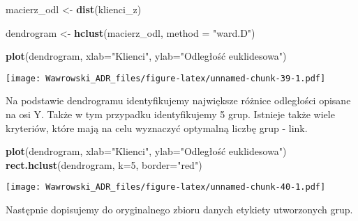 \documentclass[]{book}
\newenvironment{Shaded}{\begin{snugshade}}{\end{snugshade}}
\newcommand{\KeywordTok}[1]{\textcolor[rgb]{0.13,0.29,0.53}{\textbf{#1}}}
\newcommand{\DataTypeTok}[1]{\textcolor[rgb]{0.13,0.29,0.53}{#1}}
\newcommand{\DecValTok}[1]{\textcolor[rgb]{0.00,0.00,0.81}{#1}}
\newcommand{\StringTok}[1]{\textcolor[rgb]{0.31,0.60,0.02}{#1}}
\newcommand{\OperatorTok}[1]{\textcolor[rgb]{0.81,0.36,0.00}{\textbf{#1}}}
\newcommand{\NormalTok}[1]{#1}
\begin{document}
\begin{Shaded}
\begin{Highlighting}[]
\NormalTok{macierz_odl <-}\StringTok{ }\KeywordTok{dist}\NormalTok{(klienci_z)}

\NormalTok{dendrogram <-}\StringTok{ }\KeywordTok{hclust}\NormalTok{(macierz_odl, }\DataTypeTok{method =} \StringTok{"ward.D"}\NormalTok{)}

\KeywordTok{plot}\NormalTok{(dendrogram, }\DataTypeTok{xlab=}\StringTok{"Klienci"}\NormalTok{, }\DataTypeTok{ylab=}\StringTok{"Odległość euklidesowa"}\NormalTok{)}
\end{Highlighting}
\end{Shaded}

\texttt{[image: Wawrowski\_ADR\_files/figure-latex/unnamed-chunk-39-1.pdf]}

Na podstawie dendrogramu identyfikujemy największe różnice odległości
opisane na osi Y. Także w tym przypadku identyfikujemy 5 grup. Istnieje
także wiele kryteriów, które mają na celu wyznaczyć optymalną liczbę
grup - link.

\begin{Shaded}
\begin{Highlighting}[]
\KeywordTok{plot}\NormalTok{(dendrogram, }\DataTypeTok{xlab=}\StringTok{"Klienci"}\NormalTok{, }\DataTypeTok{ylab=}\StringTok{"Odległość euklidesowa"}\NormalTok{)}
\KeywordTok{rect.hclust}\NormalTok{(dendrogram, }\DataTypeTok{k=}\DecValTok{5}\NormalTok{, }\DataTypeTok{border=}\StringTok{"red"}\NormalTok{)}
\end{Highlighting}
\end{Shaded}

\texttt{[image: Wawrowski\_ADR\_files/figure-latex/unnamed-chunk-40-1.pdf]}

Następnie dopisujemy do oryginalnego zbioru danych etykiety utworzonych
grup.

\begin{Shaded}
\end{Shaded}
\end{document}

